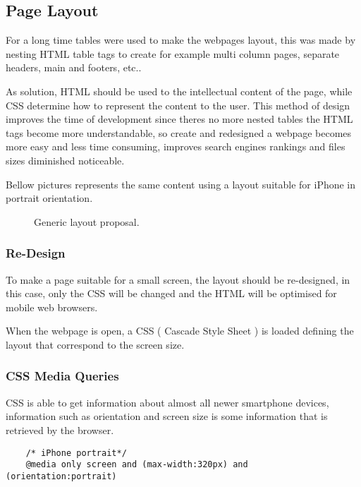 \newpage

\subsection{Page Layout}

For a long time tables were used to make the webpages layout, this was made by nesting HTML table tags to create for example multi column pages, separate headers, main and footers, etc..

As solution, HTML should be used to the intellectual content of the page, while CSS determine how to represent the content to the user. This method of design improves the time of development since theres no more nested tables the HTML tags become more understandable, so create and redesigned a webpage becomes more easy and less time consuming, improves search engines rankings and files sizes diminished noticeable.

Bellow pictures represents the same content using a layout suitable for iPhone in portrait orientation.

\begin{figure}[h!]

\caption{Generic layout proposal.}
\end{figure}

\subsubsection{Re-Design}

To make a page suitable for a small screen, the layout should be re-designed, in this case, only the CSS will be changed and the HTML will be optimised for mobile web browsers.

When the webpage is open, a CSS ( Cascade Style Sheet ) is loaded defining the layout that correspond to the screen size.

\subsubsection{CSS Media Queries}  %

CSS is able to get information about almost all newer smartphone devices, information such as orientation and screen size is some information that is retrieved by the browser.

\begin{lstlisting}
	/* iPhone portrait*/
	@media only screen and (max-width:320px) and (orientation:portrait)
\end{lstlisting}


